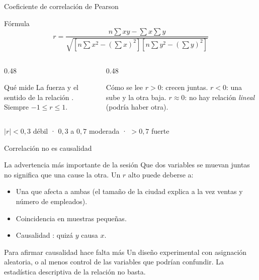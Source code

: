 \documentclass[aspectratio=169,10pt]{beamer}
\begin{document}
\begin{frame}{Coeficiente de correlación de Pearson}
  \begin{block}{Fórmula}
    \[ r=\frac{n\sum xy-\sum x\sum y}
       {\sqrt{\left[n\sum x^{2}-(\sum x)^{2}\right]
              \left[n\sum y^{2}-(\sum y)^{2}\right]}} \]
  \end{block}

  \vspace{0.2cm}
  \begin{columns}[T,onlytextwidth]
    \begin{column}{0.48\textwidth}
      \begin{exampleblock}{Qué mide}
        \footnotesize
        La fuerza y el sentido de la relación . Siempre
        $-1\le r\le 1$.
      \end{exampleblock}
    \end{column}
    \begin{column}{0.48\textwidth}
      \begin{alertblock}{Cómo se lee}
        \footnotesize
        $r>0$: crecen juntas. $r<0$: una sube y la otra baja. $r\approx 0$: no
        hay relación \emph{lineal} (podría haber otra).
      \end{alertblock}
    \end{column}
  \end{columns}

  \vspace{0.2cm}
  \footnotesize
  \centering
  $|r|<0{,}3$ débil \quad · \quad $0{,}3$ a $0{,}7$ moderada \quad · \quad
  $>0{,}7$ fuerte
\end{frame}

\begin{frame}{Correlación no es causalidad}
  \begin{alertblock}{La advertencia más importante de la sesión}
    \footnotesize
    Que dos variables se muevan juntas no significa que una cause la otra. Un
    $r$ alto puede deberse a:
    \begin{itemize}
      \item Una  que afecta a ambas (el tamaño de la
            ciudad explica a la vez ventas y número de empleados).
      \item Coincidencia en muestras pequeñas.
      \item Causalidad : quizá $y$ causa $x$.
    \end{itemize}
  \end{alertblock}

  \vspace{0.2cm}
  \begin{block}{Para afirmar causalidad hace falta más}
    \footnotesize
    Un diseño experimental con asignación aleatoria, o al menos control de las
    variables que podrían confundir. La estadística descriptiva de la relación
    no basta.
  \end{block}
\end{frame}
\end{document}
